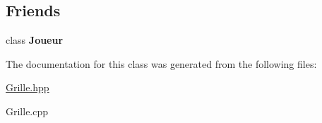 \subsection*{Friends}
\begin{DoxyCompactItemize}
\item 
\mbox{\label{class_grille_aa7383e9c02af27ebd2d9d65053e899ce}} 
class {\bfseries Joueur}
\end{DoxyCompactItemize}


The documentation for this class was generated from the following files\+:\begin{DoxyCompactItemize}
\item 
\mbox{\hyperlink{_grille_8hpp}{Grille.\+hpp}}\item 
Grille.\+cpp\end{DoxyCompactItemize}
